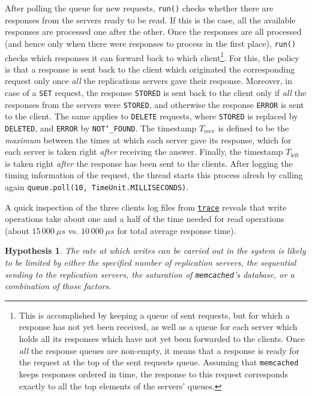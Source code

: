 \documentclass[11pt]{article}
\newtheorem{hyp}{Hypothesis}
\theoremstyle{definition}
\newenvironment{ana}[1][\proofname]{\begin{proof}[Analysis]}{\end{proof}}
\newcommand\Trecv{T_{\mathrm{recv}}}
\newcommand\Tleft{T_{\mathrm{left}}}
\renewcommand\t\texttt
\begin{document}
After polling the queue for new requests, \t{run()} checks whether there are responses from the servers ready to be read.
If this is the case, all the available responses are processed one after the other.
Once the responses are all processed (and hence only when there were responses to process in the first place), \t{run()} checks which responses it can forward back to which client\footnote{This is accomplished by keeping a queue of sent requests, but for which a response has not yet been received, as well as a queue for each server which holds all its responses which have not yet been forwarded to the clients. Once \emph{all} the response queues are non-empty, it means that a response is ready for the request at the top of the sent requests queue. Assuming that \t{memcached} keeps responses ordered in time, the response to this request corresponds exactly to all the top elements of the servers' queues.}.
For this, the policy is that a response is sent back to the client which originated the corresponding request only once \emph{all} the replications servers gave their response.
Moreover, in case of a \t{SET} request, the response \t{STORED} is sent back to the client only if \emph{all} the responses from the servers were \t{STORED}, and otherwise the response \t{ERROR} is sent to the client.
The same applies to \t{DELETE} requests, where \t{STORED} is replaced by \t{DELETED}, and \t{ERROR} by \t{NOT\char`_FOUND}.
The timestamp $\Trecv$ is defined to be the \emph{maximum} between the times at which each server gave its response, which for each server is taken right \emph{after} receiving the answer.
Finally, the timestamp $\Tleft$ is taken right \emph{after} the response has been sent to the clients.
After logging the timing information of the request, the thread starts this process afresh by calling again \t{queue.poll(10, TimeUnit.MILLISECONDS)}.

A quick inspection of the three clients log files from \hyperref[f:trace]{\t{trace}} reveals that write operations take about one and a half of the time needed for read operations (about $15\,000\ \mu s$ vs. $10\,000\ \mu s$ for total average response time).
\begin{hyp}
    The rate at which writes can be carried out in the system is likely to be limited by either the specified number of replication servers, the sequential sending to the replication servers, the saturation of \t{memcached}'s database, or a combination of those factors.
\end{hyp}

\end{document}
